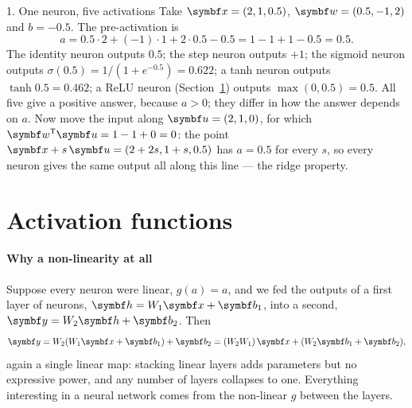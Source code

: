 \documentclass[11pt]{article}
\newcommand{\w}{\vect{w}}
\newcommand{\hv}{\vect{h}}
\newcommand{\y}{\vect{y}}
\newcommand{\vb}{\vect{b}}
\begin{document}
\begin{worked}{1. One neuron, five activations}
Take $\x = (2, 1, 0.5)$, $\w = (0.5, -1, 2)$ and $b = -0.5$. The pre-activation is
\[
  a = 0.5 \cdot 2 + (-1)\cdot 1 + 2 \cdot 0.5 - 0.5 = 1 - 1 + 1 - 0.5 = 0.5 .
\]
The identity neuron outputs $0.5$; the step neuron outputs $+1$; the sigmoid neuron outputs $\sigma(0.5) = 1/(1 +
e^{-0.5}) = 0.622$; a tanh neuron outputs $\tanh 0.5 = 0.462$; a ReLU neuron (Section~\ref{sec:activations}) outputs
$\max(0, 0.5) = 0.5$. All five give a positive answer, because $a > 0$; they differ in how the answer depends on
$a$. Now move the input along $\vect{u} = (2, 1, 0)$, for which $\w\T\vect{u} = 1 - 1 + 0 = 0$: the point
$\x + s\,\vect{u} = (2 + 2s, 1 + s, 0.5)$ has $a = 0.5$ for every $s$, so every neuron gives the same output all along
this line --- the ridge property.
\end{worked}

\section{Activation functions}\label{sec:activations}

\paragraph{Why a non-linearity at all} Suppose every neuron were linear, $g(a) = a$, and we fed the outputs of a first
layer of neurons, $\hv = W_1\x + \vb_1$, into a second, $\y = W_2\hv + \vb_2$. Then
\[
  \y = W_2(W_1\x + \vb_1) + \vb_2 = (W_2W_1)\,\x + (W_2\vb_1 + \vb_2) ,
\]
again a single linear map: stacking linear layers adds parameters but no expressive power, and any number of layers
collapses to one. Everything interesting in a neural network comes from the non-linear $g$ between the layers.
\end{document}
